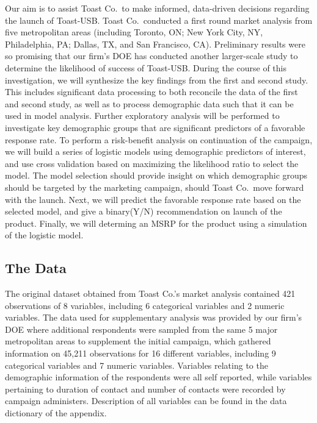 \documentclass[]{article}
\begin{document}
Our aim is to assist Toast Co.~to make informed, data-driven decisions
regarding the launch of Toast-USB. Toast Co.~conducted a first round
market analysis from five metropolitan areas (including Toronto, ON; New
York City, NY, Philadelphia, PA; Dallas, TX, and San Francisco, CA).
Preliminary results were so promising that our firm's DOE has conducted
another larger-scale study to determine the likelihood of success of
Toast-USB. During the course of this investigation, we will synthesize
the key findings from the first and second study. This includes
significant data processing to both reconcile the data of the first and
second study, as well as to process demographic data such that it can be
used in model analysis. Further exploratory analysis will be performed
to investigate key demographic groups that are significant predictors of
a favorable response rate. To perform a risk-benefit analysis on
continuation of the campaign, we will build a series of logistic models
using demographic predictors of interest, and use cross validation based
on maximizing the likelihood ratio to select the model. The model
selection should provide insight on which demographic groups should be
targeted by the marketing campaign, should Toast Co.~move forward with
the launch. Next, we will predict the favorable response rate based on
the selected model, and give a binary(Y/N) recommendation on launch of
the product. Finally, we will determing an MSRP for the product using a
simulation of the logistic model.

\hypertarget{the-data}{%
\subsection{The Data}\label{the-data}}

The original dataset obtained from Toast Co.'s market analysis contained
421 observations of 8 variables, including 6 categorical variables and 2
numeric variables. The data used for supplementary analysis was provided
by our firm's DOE where additional respondents were sampled from the
same 5 major metropolitan areas to supplement the initial campaign,
which gathered information on 45,211 observations for 16 different
variables, including 9 categorical variables and 7 numeric variables.
Variables relating to the demographic information of the respondents
were all self reported, while variables pertaining to duration of
contact and number of contacts were recorded by campaign administers.
Description of all variables can be found in the data dictionary of the
appendix.
\end{document}
